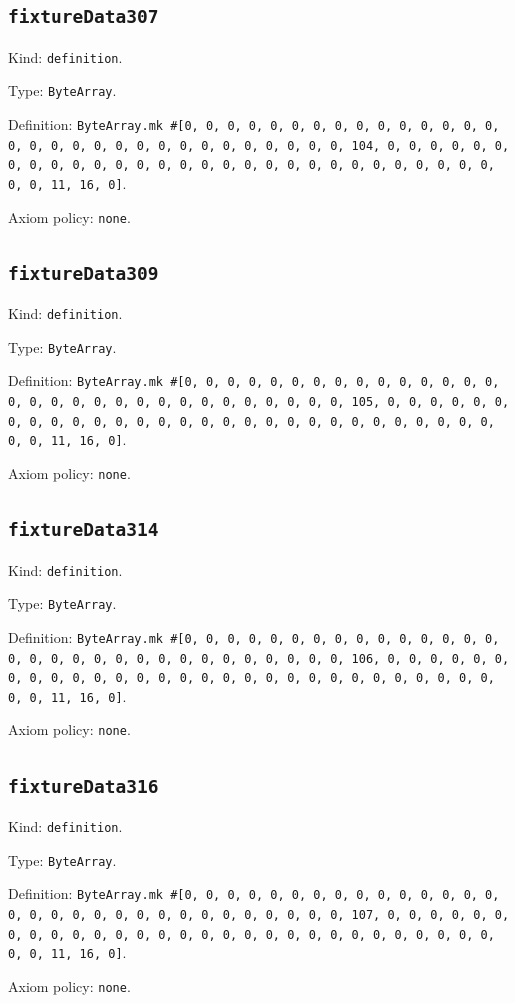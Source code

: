 \documentclass[11pt]{article}
\begin{document}
\subsection*{\texttt{fixtureData307}}
\noindent Kind: \texttt{definition}.\par
\noindent Type: \texttt{ByteArray}.\par
\noindent Definition: \texttt{ByteArray.mk \#[0, 0, 0, 0, 0, 0, 0, 0, 0, 0, 0, 0, 0, 0, 0, 0, 0, 0, 0, 0, 0, 0, 0, 0, 0, 0, 0, 0, 0, 0, 0, 104, 0, 0, 0, 0, 0, 0, 0, 0, 0, 0, 0, 0, 0, 0, 0, 0, 0, 0, 0, 0, 0, 0, 0, 0, 0, 0, 0, 0, 0, 0, 0, 11, 16, 0]}.\par
\noindent Axiom policy: \texttt{none}.\par
\subsection*{\texttt{fixtureData309}}
\noindent Kind: \texttt{definition}.\par
\noindent Type: \texttt{ByteArray}.\par
\noindent Definition: \texttt{ByteArray.mk \#[0, 0, 0, 0, 0, 0, 0, 0, 0, 0, 0, 0, 0, 0, 0, 0, 0, 0, 0, 0, 0, 0, 0, 0, 0, 0, 0, 0, 0, 0, 0, 105, 0, 0, 0, 0, 0, 0, 0, 0, 0, 0, 0, 0, 0, 0, 0, 0, 0, 0, 0, 0, 0, 0, 0, 0, 0, 0, 0, 0, 0, 0, 0, 11, 16, 0]}.\par
\noindent Axiom policy: \texttt{none}.\par
\subsection*{\texttt{fixtureData314}}
\noindent Kind: \texttt{definition}.\par
\noindent Type: \texttt{ByteArray}.\par
\noindent Definition: \texttt{ByteArray.mk \#[0, 0, 0, 0, 0, 0, 0, 0, 0, 0, 0, 0, 0, 0, 0, 0, 0, 0, 0, 0, 0, 0, 0, 0, 0, 0, 0, 0, 0, 0, 0, 106, 0, 0, 0, 0, 0, 0, 0, 0, 0, 0, 0, 0, 0, 0, 0, 0, 0, 0, 0, 0, 0, 0, 0, 0, 0, 0, 0, 0, 0, 0, 0, 11, 16, 0]}.\par
\noindent Axiom policy: \texttt{none}.\par
\subsection*{\texttt{fixtureData316}}
\noindent Kind: \texttt{definition}.\par
\noindent Type: \texttt{ByteArray}.\par
\noindent Definition: \texttt{ByteArray.mk \#[0, 0, 0, 0, 0, 0, 0, 0, 0, 0, 0, 0, 0, 0, 0, 0, 0, 0, 0, 0, 0, 0, 0, 0, 0, 0, 0, 0, 0, 0, 0, 107, 0, 0, 0, 0, 0, 0, 0, 0, 0, 0, 0, 0, 0, 0, 0, 0, 0, 0, 0, 0, 0, 0, 0, 0, 0, 0, 0, 0, 0, 0, 0, 11, 16, 0]}.\par
\noindent Axiom policy: \texttt{none}.\par
\end{document}
